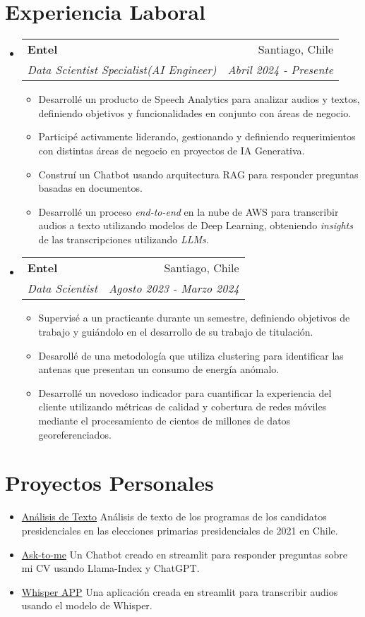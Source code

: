 \documentclass[letterpaper,11pt]{article}
\makeatletter
\newcommand{\resumeItem}[2]{
  \item\small{
    \textbf{#1}{#2 \vspace{-2pt}}
  }
}
\newcommand{\resumeSubheading}[4]{
  \vspace{-1pt}\item
    \begin{tabular*}{0.97\textwidth}{l@{\extracolsep{\fill}}r}
      \textbf{#1} & #2 \\
      \textit{\small#3} & \textit{\small #4} \\
    \end{tabular*}\vspace{-8pt}
}
\newcommand{\resumeSubItem}[2]{\resumeItem{#1}{#2}\vspace{-4pt}}
\newcommand{\resumeSubHeadingListStart}{\begin{itemize}[leftmargin=*]}
\newcommand{\resumeSubHeadingListEnd}{\end{itemize}}
\newcommand{\resumeItemListStart}{\begin{itemize}}
\newcommand{\resumeItemListEnd}{\end{itemize}\vspace{-5pt}}
\makeatother
\begin{document}
\section{Experiencia Laboral}
  \resumeSubHeadingListStart

    \resumeSubheading
      {Entel}{Santiago, Chile}
      {Data Scientist Specialist(AI Engineer)}{Abril 2024 - Presente}
      \resumeItemListStart
      \resumeItem{}
      {Desarrollé un producto de Speech Analytics para analizar audios y textos, definiendo objetivos y funcionalidades en conjunto con áreas de negocio.}
      \resumeItem{}
        {Participé activamente liderando, gestionando y definiendo requerimientos con distintas áreas de negocio en proyectos de IA Generativa.}
      \resumeItem{}
        {Construí un Chatbot usando arquitectura RAG para responder preguntas basadas en documentos.}
      \resumeItem{}
        {Desarrollé un proceso \textit{end-to-end} en la nube de AWS para transcribir audios a texto utilizando modelos de Deep Learning, obteniendo \textit{insights} de las transcripciones utilizando \textit{LLMs}.}
      \resumeItemListEnd

    \resumeSubheading
      {Entel}{Santiago, Chile}
      {Data Scientist}{Agosto 2023 - Marzo 2024}
      \resumeItemListStart
        \resumeItem{}
          {Supervisé a un practicante durante un semestre, definiendo objetivos de trabajo y guiándolo en el desarrollo de su trabajo de titulación.}
        \resumeItem{}
          {Desarollé de una metodología que utiliza clustering para identificar las antenas que presentan un consumo de energía anómalo.}
        \resumeItem{}
          {Desarrollé un novedoso indicador para cuantificar la experiencia del cliente utilizando métricas de calidad y cobertura de redes móviles mediante el procesamiento de cientos de millones de datos georeferenciados.}
      \resumeItemListEnd

  \resumeSubHeadingListEnd


\section{Proyectos Personales}
  \resumeSubHeadingListStart
  \resumeSubItem{}
  {\href{https://github.com/SebasUrbina/TextAnalysisProgramaCandidatos2021}{Análisis de Texto} Análisis de texto de los programas de los candidatos presidenciales en las elecciones primarias presidenciales de 2021 en Chile.}
  \resumeSubItem{}
  {\href{https://github.com/SebasUrbina/ask-to-me}{Ask-to-me} Un Chatbot creado en streamlit para responder preguntas sobre mi CV usando Llama-Index y ChatGPT.}
  \resumeSubItem{}
      {\href{https://github.com/SebasUrbina/whisper-app}{Whisper APP} Una aplicación creada en streamlit para transcribir audios usando el modelo de Whisper.}
  \resumeSubHeadingListEnd
\end{document}
